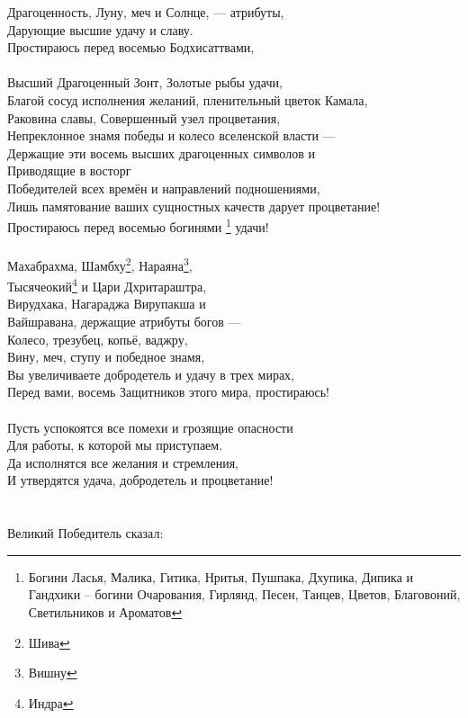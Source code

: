 Драгоценность, Луну, меч и Солнце, — атрибуты,\\
Дарующие высшие удачу и славу.\\
Простираюсь перед восемью Бодхисаттвами, \\
\\
Высший Драгоценный Зонт, Золотые рыбы удачи,\\
Благой сосуд исполнения желаний, пленительный цветок Камала,\\
Раковина славы, Совершенный узел процветания,\\
Непреклонное знамя победы и колесо вселенской власти —\\
Держащие эти восемь высших драгоценных символов  и\\
Приводящие в восторг \\ \indent Победителей всех времён и направлений подношениями,\\
Лишь памятование ваших сущностных качеств дарует процветание!\\
Простираюсь перед восемью богинями
\footnote{ Богини Ласья, Малика, Гитика, Нритья, Пушпака, 
           Дхупика, Дипика и Гандхики – богини Очарования, 
           Гирлянд, Песен, Танцев, Цветов, Благовоний, 
           Светильников и Ароматов} удачи! \\
\\
Махабрахма, Шамбху\footnote{Шива}, Нараяна\footnote{Вишну},\\
Тысячеокий\footnote{Индра} и Цари Дхритараштра,\\
Вирудхака, Нагараджа Вирупакша и\\
Вайшравана, держащие атрибуты богов —\\
Колесо, трезубец, копьё, ваджру,\\
Вину, меч, ступу и победное знамя,\\
Вы увеличиваете добродетель и удачу в трех мирах,\\
Перед вами, восемь Защитников этого мира, простираюсь!\\
\\
\newpage
Пусть успокоятся все помехи и грозящие опасности\\
Для работы, к которой мы приступаем.\\
Да исполнятся все желания и стремления,\\
И утвердятся удача, добродетель и процветание!\\
\\
\vspace{1cm}
\\
\scriptsize
Великий Победитель сказал:
